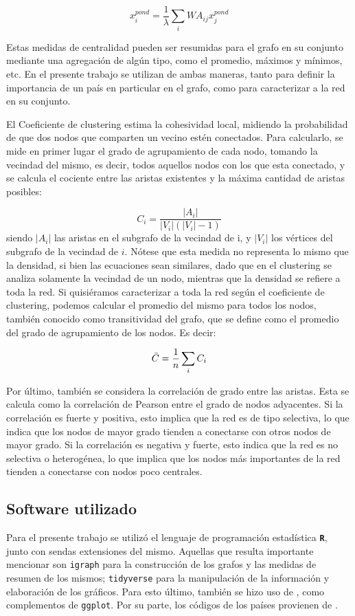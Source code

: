 \documentclass[class=article, crop=false]{standalone}
\begin{document}
$$
x_i^{pond}=\frac{1}{\lambda}  \sum_{i} WA_{ij}x_{j}^{pond}
$$

Estas medidas de centralidad pueden ser resumidas para el grafo en su conjunto mediante una agregación de algún tipo, como el promedio, máximos y mínimos, etc. En el presente trabajo se utilizan de ambas maneras, tanto para definir la importancia de un país en particular en el grafo, como para caracterizar a la red en su conjunto.
\par

El Coeficiente de clustering estima la cohesividad local, midiendo la probabilidad de que dos nodos que comparten un vecino estén conectados. Para calcularlo, se mide en primer lugar el grado de agrupamiento de cada nodo, tomando la vecindad del mismo, es decir, todos aquellos nodos con los que esta conectado, y se calcula el cociente entre las aristas existentes y la máxima cantidad de aristas posibles:

$$
C_i = \frac{|A_i|}{|V_i|(|V_i|-1)}
$$
siendo $|A_i|$ las aristas en el subgrafo de la vecindad de i, y $|V_i|$ los vértices del subgrafo de la vecindad de $i$. Nótese que esta medida no representa lo mismo que la densidad, si bien las ecuaciones sean similares, dado que en el clustering se analiza solamente la vecindad de un nodo, mientras que la densidad se refiere a toda la red.
Si quisiéramos caracterizar a toda la red según el coeficiente de clustering, podemos calcular el promedio del mismo para todos los nodos, también conocido como transitividad del grafo, que se define como el promedio del grado de agrupamiento de los nodos. Es decir:

$$
\Bar{C} = \frac{1}{n} \sum_{i} C_{i}
$$ 


Por último, también se considera la correlación de grado entre las aristas. Esta se calcula como la correlación de Pearson entre el grado de nodos adyacentes. Si la correlación es fuerte y positiva, esto implica que la red es de tipo selectiva, lo que indica que los nodos de mayor grado tienden a conectarse con otros nodos de mayor grado. Si la correlación es negativa y fuerte, esto indica que la red es no selectiva o heterogénea, lo que implica que los nodos más importantes de la red tienden a conectarse con nodos poco centrales. 


\subsection{Software utilizado}

Para el presente trabajo se utilizó el lenguaje de programación estadística \texttt{\textbf{R}}\citep{RCoreTeam2017}, junto con sendas extensiones del mismo. Aquellas que resulta importante mencionar son \texttt{igraph}\citep{Csardi2006} para la construcción de los grafos y las medidas de resumen de los mismos; \texttt{tidyverse}\citep{Wickham2017} para la manipulación de la información y elaboración de los gráficos. Para esto último, también se hizo uso de  \citep{Wilke2017,Arnold2017,Neuwirth2014,Slowikowski2017,Vu2011}, como complementos de \texttt{ggplot}. Por su parte, los códigos de los países provienen de \citep{Arel-Bundock2017}.
\end{document}
